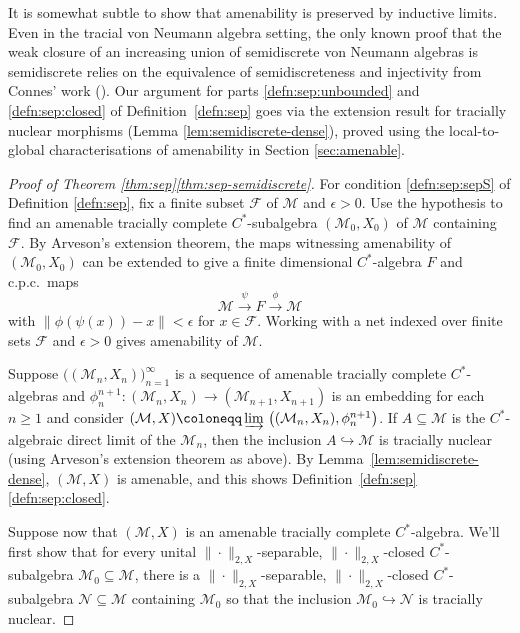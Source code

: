 \documentclass[a4paper,11pt]{amsart}
\theoremstyle{definition}
\numberwithin{equation}{section}
\numberwithin{theorem}{section}
\newcommand{\M}{\mathcal{M}}
\begin{document}
It is somewhat subtle to show that {}amenability is preserved by inductive limits.  Even in the tracial von Neumann algebra setting, the only known proof that the weak closure of an increasing union of semidiscrete von Neumann algebras is semidiscrete relies on the equivalence of semidiscreteness and injectivity from Connes' work (\cite{Co76}). Our argument for parts \ref{defn:sep:unbounded} and \ref{defn:sep:closed} of Definition~\ref{defn:sep} goes via the extension result for tracially nuclear morphisms (Lemma \ref{lem:semidiscrete-dense}), proved using the local-to-global characterisations of {}amenability in Section \ref{sec:amenable}.





\begin{proof}[Proof of Theorem \ref{thm:sep}\ref{thm:sep-semidiscrete}]

For condition \ref{defn:sep:sepS} of Definition \ref{defn:sep}, fix a finite subset $\mathcal F$ of $\mathcal M$ and $\epsilon>0$.  Use the hypothesis to find an {}amenable tracially complete $C^*$-subalgebra $(\mathcal M_0,X_0)$ of $\mathcal M$ containing $\mathcal F$.  By Arveson's extension theorem, the maps witnessing {}amenability of $(\mathcal M_0,X_0)$ can be extended to give a finite dimensional $C^*$-algebra $F$ and c.p.c.\ maps 
\begin{equation}
    \mathcal M \overset\psi\longrightarrow F \overset\phi\longrightarrow \mathcal M
\end{equation} 
with $\|\phi(\psi(x))-x\|<\epsilon$ for $x\in \mathcal F$. Working with a net indexed over finite sets $\mathcal F$ and $\epsilon>0$ gives {}amenability of $\mathcal M$.

	Suppose $\big((\M_n, X_n)\big)_{n=1}^\infty$ is a sequence of {}amenable tracially complete $C^*$-algebras and $\phi_n^{n+1} \colon (\M_n, X_n) \rightarrow (\M_{n+1}, X_{n+1})$ is an embedding for each $n \geq 1$ and consider $(\M, X) \coloneqq \varinjlim\, \big((\M_n, X_n), \phi_n^{n+1}\big)$.  If $A \subseteq \mathcal M$ is the $C^*$-algebraic direct limit of the $\mathcal M_n$, then the inclusion $A \hookrightarrow \mathcal M$ is tracially nuclear (using Arveson's extension theorem as above).  By Lemma~\ref{lem:semidiscrete-dense}, $(\mathcal M, X)$ is {}amenable, and this shows Definition~\ref{defn:sep}\ref{defn:sep:closed}. 
 


	Suppose now that $(\mathcal M, X)$ is an {}amenable tracially complete $C^*$-algebra.  We'll first show that for every unital  $\|\cdot\|_{2, X}$-separable, $\|\cdot\|_{2, X}$-closed  $C^*$-subalgebra $\M_0 \subseteq \M$, there is a   $\|\cdot\|_{2, X}$-separable, $\|\cdot\|_{2, X}$-closed $C^*$-subalgebra $\mathcal N \subseteq \M$ containing $\M_0$ so that the inclusion  $\M_0  \hookrightarrow \mathcal N$ is tracially nuclear.
	

\end{proof}
\end{document}
